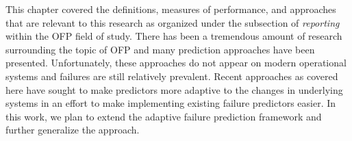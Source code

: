 This chapter covered the definitions, measures of performance, and approaches that are relevant to this research as organized under the subsection of \emph{reporting} within the OFP field of study.  There has been a tremendous amount of research surrounding the topic of OFP and many prediction approaches have been presented.  Unfortunately, these approaches do not appear on modern operational systems and failures are still relatively prevalent.  Recent approaches as covered here have sought to make predictors more adaptive to the changes in underlying systems in an effort to make implementing existing failure predictors easier.  In this work, we plan to extend the adaptive failure prediction framework and further generalize the approach.  
